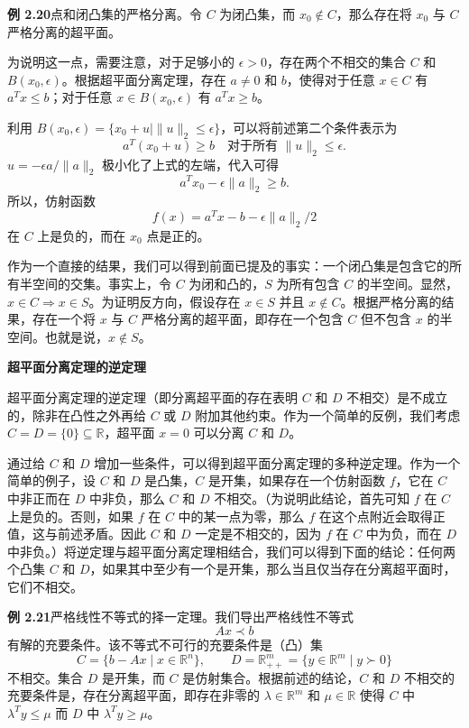 \documentclass[UTF8, 12pt, fontset=fandol, oneside]{ctexart}
\begin{document}
\noindent\textbf{例 2.20}\quad 点和闭凸集的严格分离。令 $C$ 为闭凸集，而 $x_0\notin C$，那么存在将 $x_0$ 与 $C$ 严格分离的超平面。

为说明这一点，需要注意，对于足够小的 $\epsilon>0$，存在两个不相交的集合 $C$ 和 $B(x_0,\epsilon)$。根据超平面分离定理，存在 $a\ne0$ 和 $b$，使得对于任意 $x\in C$ 有 $a^Tx\le b$；对于任意 $x\in B(x_0,\epsilon)$ 有 $a^Tx\ge b$。

利用 $B(x_0,\epsilon)=\{x_0+u\mid \|u\|_2\le\epsilon\}$，可以将前述第二个条件表示为
\[
  a^T(x_0+u)\ge b\quad \text{对于所有 }\|u\|_2\le\epsilon.
\]
$u=-\epsilon a/\|a\|_2$ 极小化了上式的左端，代入可得
\[
  a^Tx_0-\epsilon\|a\|_2\ge b.
\]
所以，仿射函数
\[
  f(x)=a^Tx-b-\epsilon\|a\|_2/2
\]
在 $C$ 上是负的，而在 $x_0$ 点是正的。

作为一个直接的结果，我们可以得到前面已提及的事实：一个闭凸集是包含它的所有半空间的交集。事实上，令 $C$ 为闭和凸的，$S$ 为所有包含 $C$ 的半空间。显然，$x\in C\Rightarrow x\in S$。为证明反方向，假设存在 $x\in S$ 并且 $x\notin C$。根据严格分离的结果，存在一个将 $x$ 与 $C$ 严格分离的超平面，即存在一个包含 $C$ 但不包含 $x$ 的半空间。也就是说，$x\notin S$。

\noindent\textbf{超平面分离定理的逆定理}

超平面分离定理的逆定理（即分离超平面的存在表明 $C$ 和 $D$ 不相交）是不成立的，除非在凸性之外再给 $C$ 或 $D$ 附加其他约束。作为一个简单的反例，我们考虑 $C=D=\{0\}\subseteq\mathbb{R}$，超平面 $x=0$ 可以分离 $C$ 和 $D$。

通过给 $C$ 和 $D$ 增加一些条件，可以得到超平面分离定理的多种逆定理。作为一个简单的例子，设 $C$ 和 $D$ 是凸集，$C$ 是开集，如果存在一个仿射函数 $f$，它在 $C$ 中非正而在 $D$ 中非负，那么 $C$ 和 $D$ 不相交。（为说明此结论，首先可知 $f$ 在 $C$ 上是负的。否则，如果 $f$ 在 $C$ 中的某一点为零，那么 $f$ 在这个点附近会取得正值，这与前述矛盾。因此 $C$ 和 $D$ 一定是不相交的，因为 $f$ 在 $C$ 中为负，而在 $D$ 中非负。）将逆定理与超平面分离定理相结合，我们可以得到下面的结论：任何两个凸集 $C$ 和 $D$，如果其中至少有一个是开集，那么当且仅当存在分离超平面时，它们不相交。

\noindent\textbf{例 2.21}\quad 严格线性不等式的择一定理。我们导出严格线性不等式
\begin{equation}
  Ax\prec b
  \tag{2.17}
\end{equation}
有解的充要条件。该不等式不可行的充要条件是（凸）集
\[
  C=\{b-Ax\mid x\in\mathbb{R}^n\},\qquad
  D=\mathbb{R}_{++}^m=\{y\in\mathbb{R}^m\mid y\succ0\}
\]
不相交。集合 $D$ 是开集，而 $C$ 是仿射集合。根据前述的结论，$C$ 和 $D$ 不相交的充要条件是，存在分离超平面，即存在非零的 $\lambda\in\mathbb{R}^m$ 和 $\mu\in\mathbb{R}$ 使得 $C$ 中 $\lambda^Ty\le\mu$ 而 $D$ 中 $\lambda^Ty\ge\mu$。
\end{document}
